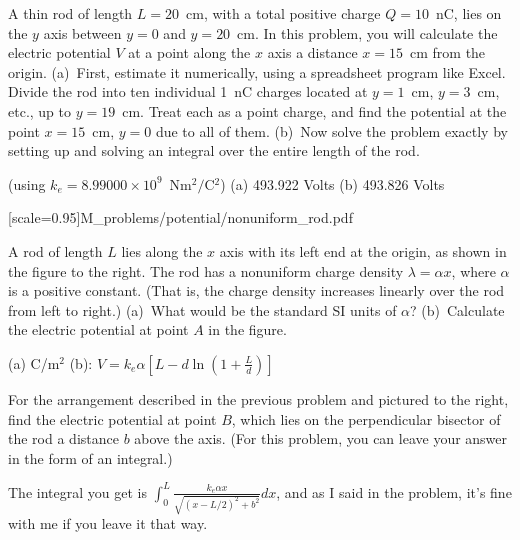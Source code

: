 \begin{Exercise}
A thin rod of length $L=20$~cm, with a total positive charge $Q=10$~nC, lies on the $y$ axis between $y=0$ and $y=20$~cm.  
In this problem, you will calculate the electric potential $V$ at a point along the $x$ axis a distance $x=15$~cm from the origin.  
(a)~First, estimate it numerically, using a spreadsheet program like Excel.  
Divide the rod into ten individual 1~nC charges located at $y=1$~cm, $y=3$~cm, etc., up to $y=19$~cm.  
Treat each as a point charge, and find the potential at the point $x=15$~cm, $y=0$ due to all of them.  
(b)~Now solve the problem exactly by setting up and solving an integral over the entire length of the rod.  
\end{Exercise}
\begin{Answer}
(using $k_e=8.99000\times10^9$~Nm$^2/$C$^2$) (a) 493.922 Volts (b) 493.826 Volts
\end{Answer}

[scale=0.95]{M_problems/potential/nonuniform_rod.pdf}{
\begin{Exercise}
A rod of length $L$ lies along the $x$ axis with its left end at the origin, as shown in the figure to the right.  
The rod has a nonuniform charge density $\lambda=\alpha x$, where $\alpha$ is a positive constant.  
(That is, the charge density increases linearly over the rod from left to right.)  
(a)~What would be the standard SI units of $\alpha$?  (b)~Calculate the electric potential at point $A$ in the figure.
\end{Exercise}
\begin{Answer}
(a) C/m$^2$ (b): $\displaystyle V=k_e \alpha \left[ L - d \ln \left(1+\frac{L}{d} \right) \right]$
\end{Answer}

\begin{Exercise}
For the arrangement described in the previous problem and pictured to the right, find the electric potential at point $B$, which lies on the perpendicular bisector of the rod a distance $b$ above the axis.  
(For this problem, you can leave your answer in the form of an integral.)
\end{Exercise}
\begin{Answer}
The integral you get is
$\displaystyle \int_0^L \frac{k_e \alpha x}{\sqrt{(x-L/2)^2 +b^2}}dx$,
and as I said in the problem, it's fine with me if you leave it that way. 
\end{Answer}
}

